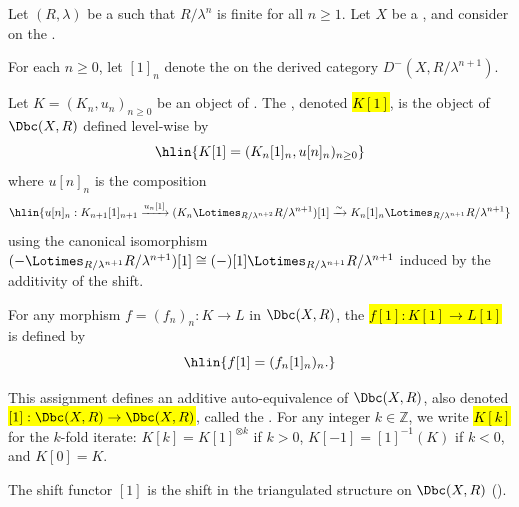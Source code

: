 \begin{definition} \label{definition:shift_functor_on_bdd_constructible_derived_category_with_integral_adic_coefficients_on_a_noetherian_scheme}
Let $(R, \lambda)$ be a   such that $R/\lambda^n$ is finite for all $n \geq 1$. Let $X$ be a , and consider  on the .

For each $n \geq 0$, let $[1]_n$ denote the  on the derived category $D^-(X, R/\lambda^{n+1})$.

Let $K = (K_n, u_n)_{n \geq 0}$ be an object of . The , denoted \hl{$K[1]$}, is the object of $\Dbc(X, R)$ defined level-wise by
$$\hlin{K[1] = (K_n[1]_n, u[n]_n)_{n \geq 0}}$$
where $u[n]_n$ is the composition
$$\hlin{u[n]_n: K_{n+1}[1]_{n+1} \xrightarrow{u_n[1]} (K_n \Lotimes_{R/\lambda^{n+2}} R/\lambda^{n+1})[1] \xrightarrow{\sim} K_n[1]_n \Lotimes_{R/\lambda^{n+1}} R/\lambda^{n+1}}$$
using the canonical isomorphism $(-\Lotimes_{R/\lambda^{n+1}} R/\lambda^{n+1})[1] \cong (-)[1] \Lotimes_{R/\lambda^{n+1}} R/\lambda^{n+1}$ induced by the additivity of the shift.

For any morphism $f = (f_n)_n: K \to L$ in $\Dbc(X, R)$, the  \hl{$f[1]: K[1] \to L[1]$} is defined by
$$\hlin{f[1] = (f_n[1]_n)_n.}$$

This assignment defines an additive auto-equivalence of $\Dbc(X, R)$, also denoted \hl{$[1]: \Dbc(X, R) \to \Dbc(X, R)$}, called the . For any integer $k \in \mathbb{Z}$, we write \hl{$K[k]$} for the $k$-fold iterate: $K[k] = K[1]^{\otimes k}$ if $k > 0$, $K[-1] = [1]^{-1}(K)$ if $k < 0$, and $K[0] = K$.

The shift functor $[1]$ is the shift in the triangulated structure on $\Dbc(X, R)$ ().
\end{definition}